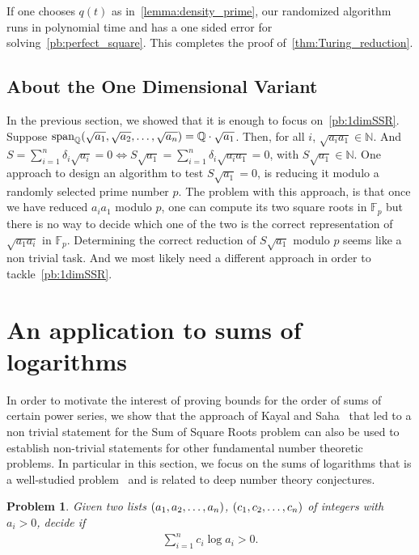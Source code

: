 \documentclass[a4paper, 11pt,dvipsnames]{article}
\newtheorem{problem}{Problem}
\DeclareMathOperator{\spn}{span}
\begin{document}
			If one chooses $q(t)$ as in~\cref{lemma:density_prime}, our randomized algorithm runs in polynomial time and has a one sided error for solving~\cref{pb:perfect_square}. This completes the proof of~\cref{thm:Turing_reduction}.

\subsection{About the One Dimensional Variant}

  In the previous section, we showed that it is enough to focus on~\cref{pb:1dimSSR}. Suppose $\spn_{\mathbb{Q}}(\lsst a n) =  \mathbb{Q}  \cdot \sqrt{a_1}$.
  Then, for all $i$, $\sqrt{a_ia_1} \in \mathbb{N}$. And $S =\sum_{i=1}^{n} \delta_i \sqrt{a_i} = 0 \iff S \sqrt{a_1} =\sum_{i=1}^{n} \delta_i \sqrt{a_i a_1} =
  0$, with $ S \sqrt{a_1} \in \mathbb{N}$. One approach  to design an algorithm to test $S \sqrt{a_1} = 0$, is reducing it modulo a randomly selected prime number $p$. 
  The problem with this approach, is that once we have reduced $a_ia_1$ modulo $p$, one can compute its two square roots in $\mathbb{F}_p$
  but there is no way to decide which one of the two is the correct representation of $\sqrt{a_1a_i}$ in $\mathbb{F}_p$. Determining the correct reduction of
  $S\sqrt{a_1}$ modulo $p$ seems like  a non trivial task. And we most likely need a different approach in order to tackle~\cref{pb:1dimSSR}.

  \section{An application to sums of logarithms}\label{sec:linearcomblogs}

  In order to motivate the interest of proving bounds for the order of sums of certain power series, we show that the approach of Kayal and
  Saha~\cite{kayal2012sum} that led to a non trivial statement for the Sum of Square Roots problem can also be used to establish non-trivial statements for
  other fundamental number theoretic problems. In particular in this section, we focus on the sums of logarithms that is a well-studied
  problem~\cite{baker1998logarithmic,etessami2014note} and is related to deep number theory conjectures. 

  \begin{problem} Given two lists $(a_{1},a_{2},\dots,a_{n})$, $(c_{1},c_{2},\dots,c_{n})$  of integers with $a_i > 0$, decide if \begin{align*} \sum_{i=1}^n c_i \log{a_i} > 0.
  \end{align*} \label{pb:log_form} \end{problem}
\end{document}
